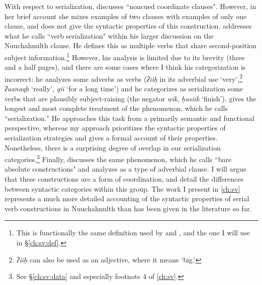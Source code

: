 With respect to serialization, \citet[p.~153--154]{rose1981} discusses ``noncued coordinate clauses". However, in her brief account she mixes examples of two clauses with examples of only one clause, and does not give the syntactic properties of this construction. %
\citet[p.~248--252]{jacobsen1993} addresses what he calls ``verb serialization" within his larger discussion on the Nuuchahnulth clause. He defines this as multiple verbs that share second-position subject information.\footnote{This is functionally the same definition used by \citeauthor{nakayama2001} and \citeauthor{davidson2002}, and the one I will use in \S\ref{ch:sv:def}.} However, his analysis is limited due to its brevity (three and a half pages), and there are some cases where I think his categorization is incorrect: he analyzes some adverbs as verbs (\textit{ʔiiḥ} in its adverbial use `very',\footnote{\textit{ʔiiḥ} can also be used as an adjective, where it means `big.'} \textit{ʔaanaqḥ} `really', \textit{qii} `for a long time') and he categorizes as serialization some verbs that are plausibly subject-raising (the negator \textit{wik}, \textit{ḥasiik} `finish'). \citet[p.~102--109]{nakayama2001} gives the longest and most complete treatment of the phenomenon, which he calls ``serialization." He approaches this task from a primarily semantic and functional perspective, whereas my approach prioritizes the syntactic properties of serialization strategies and gives a formal account of their properties. Nonetheless, there is a surprising degree of overlap in our serialization categories.\footnote{See \S\ref{ch:sv:data} and especially footnote 4 of \cref{ch:sv}.} Finally, \citet[p.~149--152]{davidson2002} discusses the same phenomenon, which he calls ``bare absolute constructions" and analyzes as a type of adverbial clause. I will argue that these constructions are a form of coordination, and detail the differences between syntactic categories within this group. The work I present in \cref{ch:sv} represents a much more detailed accounting of the syntactic properties of serial verb constructions in Nuuchahnulth than has been given in the literature so far.

